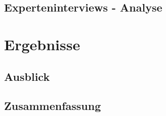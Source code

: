 \documentclass[draft,final]{vutinfth} %
\begin{document}
\section{Experteninterviews - Analyse}



\chapter{Ergebnisse}

\section{Ausblick}

\section{Zusammenfassung}



\backmatter

\listoffigures %

\cleardoublepage %
\listoftables %

\listofalgorithms
{}

\printindex

\printglossaries



\end{document}
